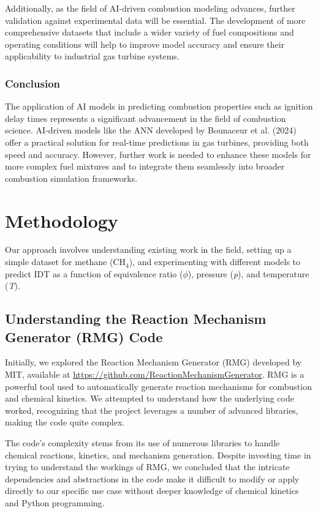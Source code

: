 \documentclass[12pt]{report}
\begin{document}
Additionally, as the field of AI-driven combustion modeling advances, further validation against experimental data will be essential. The development of more comprehensive datasets that include a wider variety of fuel compositions and operating conditions will help to improve model accuracy and ensure their applicability to industrial gas turbine systems.

\subsection{Conclusion}
The application of AI models in predicting combustion properties such as ignition delay times represents a significant advancement in the field of combustion science. AI-driven models like the ANN developed by Bounaceur et al. (2024) offer a practical solution for real-time predictions in gas turbines, providing both speed and accuracy. However, further work is needed to enhance these models for more complex fuel mixtures and to integrate them seamlessly into broader combustion simulation frameworks.





\chapter{Methodology}

Our approach involves understanding existing work in the field, setting up a simple dataset for methane (CH\(_4\)), and experimenting with different models to predict IDT as a function of equivalence ratio (\(\phi\)), pressure (\textit{p}), and temperature (\textit{T}).

\section{Understanding the Reaction Mechanism Generator (RMG) Code}

Initially, we explored the Reaction Mechanism Generator (RMG) developed by MIT, available at \url{https://github.com/ReactionMechanismGenerator}. RMG is a powerful tool used to automatically generate reaction mechanisms for combustion and chemical kinetics. We attempted to understand how the underlying code worked, recognizing that the project leverages a number of advanced libraries, making the code quite complex.

The code's complexity stems from its use of numerous libraries to handle chemical reactions, kinetics, and mechanism generation. Despite investing time in trying to understand the workings of RMG, we concluded that the intricate dependencies and abstractions in the code make it difficult to modify or apply directly to our specific use case without deeper knowledge of chemical kinetics and Python programming.
\end{document}
